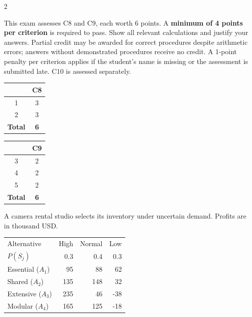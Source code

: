	\begin{multicols}{2}
		\raggedcolumns
		
		This exam assesses C8 and C9, each worth 6 points. A \textbf{minimum of 4 points per criterion} is required to pass. Show all relevant calculations and justify your answers. Partial credit may be awarded for correct procedures despite arithmetic errors; answers without demonstrated procedures receive no credit. A 1-point penalty per criterion applies if the student's name is missing or the assessment is submitted late. C10 is assessed separately.
		
		\vspace{-7mm}
		\begin{center}
			\begin{tabular}{|c|c|}
				\hline
				\textbf{\textnumero} & \textbf{C8} \\ \hline
				1 & 3 \\ \hline
				2 & 3 \\ \hline
				\textbf{Total} & \textbf{6} \\ \hline
			\end{tabular}
			\hspace{1cm}
			\begin{tabular}{|c|c|}
				\hline
				\textbf{\textnumero} & \textbf{C9} \\ \hline
				3 & 2 \\ \hline
				4 & 2 \\ \hline
				5 & 2 \\ \hline
				\textbf{Total} & \textbf{6} \\ \hline
			\end{tabular}
		\end{center}
		\vspace{-4mm}
		
		
A camera rental studio selects its inventory under uncertain demand. Profits are in thousand USD.

\vspace{-3mm}
\begin{center}\small\setlength{\tabcolsep}{4pt}
	\begin{tabular}{lrrr}\toprule
		Alternative & High & Normal & Low\\
		$P(S_j)$ & 0.3 & 0.4 & 0.3\\ \midrule
				Essential ($A_1$) & 95 & 88 & 62\\
		Shared ($A_2$) & 135 & 148 & 32\\
		Extensive ($A_3$) & 235 & 46 & -38\\
		Modular ($A_4$) & 165 & 125 & -18\\
		\bottomrule
	\end{tabular}
\end{center} \vspace*{-3mm}


\end{multicols}
